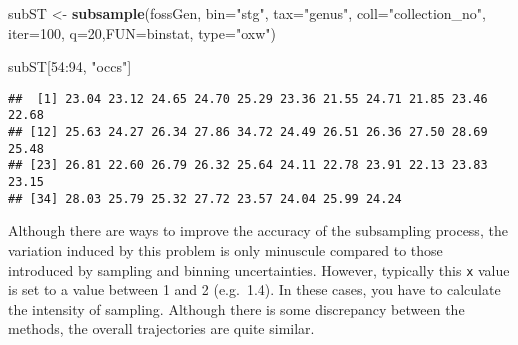 \documentclass[]{article}
\newenvironment{Shaded}{\begin{snugshade}}{\end{snugshade}}
\newcommand{\KeywordTok}[1]{\textcolor[rgb]{0.13,0.29,0.53}{\textbf{{#1}}}}
\newcommand{\DataTypeTok}[1]{\textcolor[rgb]{0.13,0.29,0.53}{{#1}}}
\newcommand{\DecValTok}[1]{\textcolor[rgb]{0.00,0.00,0.81}{{#1}}}
\newcommand{\StringTok}[1]{\textcolor[rgb]{0.31,0.60,0.02}{{#1}}}
\newcommand{\NormalTok}[1]{{#1}}
\begin{document}
\begin{Shaded}
\begin{Highlighting}[]
\NormalTok{subST <-}\StringTok{ }\KeywordTok{subsample}\NormalTok{(fossGen, }\DataTypeTok{bin=}\StringTok{"stg"}\NormalTok{, }\DataTypeTok{tax=}\StringTok{"genus"}\NormalTok{, }\DataTypeTok{coll=}\StringTok{"collection_no"}\NormalTok{, }
  \DataTypeTok{iter=}\DecValTok{100}\NormalTok{, }\DataTypeTok{q=}\DecValTok{20}\NormalTok{,}\DataTypeTok{FUN=}\NormalTok{binstat, }\DataTypeTok{type=}\StringTok{"oxw"}\NormalTok{)}
\end{Highlighting}
\end{Shaded}

\begin{Shaded}
\begin{Highlighting}[]
\NormalTok{subST[}\DecValTok{54}\NormalTok{:}\DecValTok{94}\NormalTok{, }\StringTok{"occs"}\NormalTok{]}
\end{Highlighting}
\end{Shaded}

\begin{verbatim}
##  [1] 23.04 23.12 24.65 24.70 25.29 23.36 21.55 24.71 21.85 23.46 22.68
## [12] 25.63 24.27 26.34 27.86 34.72 24.49 26.51 26.36 27.50 28.69 25.48
## [23] 26.81 22.60 26.79 26.32 25.64 24.11 22.78 23.91 22.13 23.83 23.15
## [34] 28.03 25.79 25.32 27.72 23.57 24.04 25.99 24.24
\end{verbatim}

Although there are ways to improve the accuracy of the subsampling
process, the variation induced by this problem is only minuscule
compared to those introduced by sampling and binning uncertainties.
However, typically this \texttt{x} value is set to a value between 1 and
2 (e.g.~1.4). In these cases, you have to calculate the intensity of
sampling. Although there is some discrepancy between the methods, the
overall trajectories are quite similar.
\end{document}
